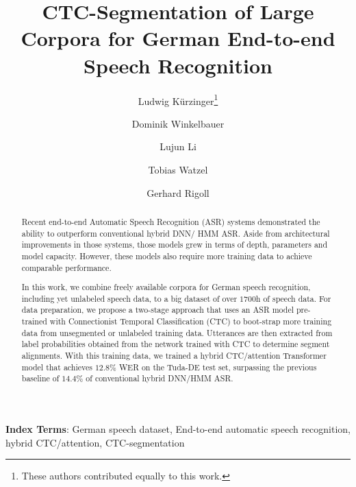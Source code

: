\documentclass[runningheads]{llncs}
\begin{document}
\newcommand*\samethanks[1][\value{footnote}]{\footnotemark[#1]}
\title{CTC-Segmentation of Large Corpora for German End-to-end Speech Recognition}
\author{ Ludwig K{\"u}rzinger\thanks{These authors contributed equally to this work.} \and
	Dominik Winkelbauer\samethanks \and
	Lujun Li \and
Tobias Watzel \and
Gerhard Rigoll}


\maketitle
\begin{abstract}
Recent end-to-end Automatic Speech Recognition (ASR) systems demonstrated the ability to outperform conventional hybrid DNN/ HMM ASR.
Aside from architectural improvements in those systems, those models grew in terms of depth, parameters and model capacity.
However, these models also require more training data to achieve comparable performance.

In this work, we combine freely available corpora for German speech recognition, including yet unlabeled speech data, to a big dataset of over $1700$h of speech data.
For data preparation, we propose a two-stage approach that uses an ASR model pre-trained with Connectionist Temporal Classification (CTC) to boot-strap more training data from unsegmented or unlabeled training data.
Utterances are then extracted from label probabilities obtained from the network trained with CTC to determine segment alignments.
With this training data, we trained a hybrid CTC/attention Transformer model that achieves $12.8\%$ WER on the Tuda-DE test set,
surpassing the previous baseline of $14.4\%$ of conventional hybrid DNN/HMM ASR.
\end{abstract}
\noindent\textbf{Index Terms}: German speech dataset, End-to-end automatic speech recognition, hybrid CTC/attention, CTC-segmentation
\end{document}
